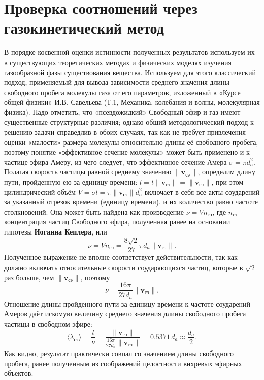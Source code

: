 \section{Проверка соотношений через газокинетический метод}

В порядке косвенной оценки истинности полученных результатов используем их в существующих теоретических методах и физических моделях изучения газообразной фазы существования вещества. Используем для этого классический подход, применяемый для вывода зависимости среднего значения длины свободного пробега молекулы газа от его параметров, изложенный в «Курсе общей физики» И.В. Савельева (Т.1, Механика, колебания и волны, молекулярная физика). Надо отметить, что «псевдожидкий» Свободный эфир и газ имеют существенные структурные различия; однако общий методологический подход к решению задачи справедлив в обоих случаях, так как не требует привлечения оценки «малости» размера молекулы относительно длины её свободного пробега, поэтому понятие «эффективное сечение молекулы» может быть применено и к частице эфира-Амеру, из чего следует, что эффективное сечение Амера \(\sigma = \pi d_a^2\). Полагая скорость частицы равной среднему значению \(\|\mathbf{v}_{\text{сэ}}\|\), определим длину пути, пройденную ею за единицу времени: \(l = t \|\mathbf{v}_{\text{сэ}}\| = \|\mathbf{v}_{\text{сэ}}\|\), при этом цилиндрический объём \(V = \sigma l = \pi \|\mathbf{v}_{\text{сэ}}\| d_a^2\) включает в себя все акты соударений за указанный отрезок времени (единицу времени), и их количество равно частоте столкновений. Она может быть найдена как произведение \(\nu = V n_{\text{сэ}}\), где \(n_{\text{сэ}}\) — концентрация частиц Свободного эфира, полученная ранее на основании гипотезы \textbf{Иоганна Кеплера}, или
\[
\nu = V n_{\text{сэ}} = \frac{8\sqrt{2}}{27} \pi d_a \|\mathbf{v}_{\text{сэ}}\|.
\]
Полученное выражение не вполне соответствует действительности, так как должно включать относительные скорости соударяющихся частиц, которые в \(\sqrt{2}\) раз больше, чем \(\|\mathbf{v}_{\text{сэ}}\|\), поэтому
\[
\nu = \frac{16\pi}{27 d_a} \|\mathbf{v}_{\text{сэ}}\|.
\]
Отношение длины пройденного пути за единицу времени к частоте соударений Амеров даёт искомую величину среднего значения длины свободного пробега частицы в свободном эфире:
\[
\langle\lambda_{\text{сэ}}\rangle = \frac{l}{\nu} = \frac{\|\mathbf{v}_{\text{сэ}}\|}{ \frac{16\pi}{27 d_a} \|\mathbf{v}_{\text{сэ}}\| } = 0.5371\,d_a \approx \frac{d_a}{2}.
\]
Как видно, результат практически совпал со значением длины свободного пробега, ранее полученным из соображений целостности вихревых эфирных объектов.

